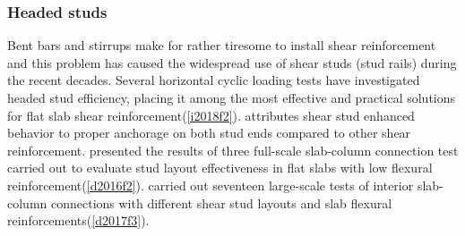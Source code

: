 \documentclass[twocolumn]{article} %
\begin{document}
\subsubsection{Headed studs}
Bent bars and stirrups make for rather tiresome to install shear reinforcement and this problem has caused the widespread use of shear studs (stud rails) during the recent decades. Several horizontal cyclic loading tests \cite{dilger1994,robertson2002,brown2003,broms2007ductility,tan2005interior,kang2008,hong2007lattice,matzke2015behavior,isufi2018} have investigated headed stud efficiency, placing it among the most effective and practical solutions for flat slab shear reinforcement(\ref{i2018f2}). \cite{ghali2005} attributes shear stud enhanced behavior to proper anchorage on both stud ends compared to other shear reinforcement. \cite{dam2016} presented the results of three full-scale slab-column connection test carried out to evaluate stud layout effectiveness in flat slabs with low flexural reinforcement(\ref{d2016f2}). \cite{dam2017punching} carried out seventeen large-scale tests of interior slab-column connections with different shear stud layouts and slab flexural reinforcements(\ref{d2017f3}).
\end{document}
